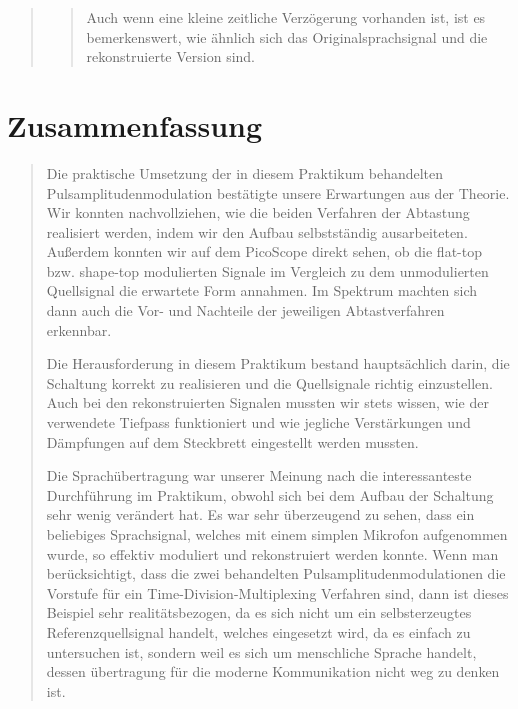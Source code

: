 \begin{quote}
\begin{quote}
            Auch wenn eine kleine zeitliche Verzögerung vorhanden ist, ist es
            bemerkenswert, wie ähnlich sich das Originalsprachsignal und die
            rekonstruierte Version sind. 
            
            \end{quote}  %
       	
       	
         	
    \end{quote}%
    
    \section{Zusammenfassung}
    \begin{quote}
	
    	Die praktische Umsetzung der in diesem Praktikum behandelten
    	Pulsamplitudenmodulation bestätigte unsere Erwartungen aus der Theorie. Wir
    	konnten nachvollziehen, wie die beiden Verfahren der Abtastung realisiert
    	werden, indem wir den Aufbau selbstständig ausarbeiteten. Außerdem konnten wir
    	auf dem PicoScope direkt sehen, ob die flat-top bzw. shape-top modulierten
    	Signale im Vergleich zu dem unmodulierten Quellsignal die erwartete Form
    	annahmen. Im Spektrum machten sich dann auch die Vor- und Nachteile der
    	jeweiligen Abtastverfahren erkennbar.
    	
    	\vspace{0.5em}
    	
    	Die Herausforderung in diesem Praktikum bestand hauptsächlich darin, die
    	Schaltung korrekt zu realisieren und die Quellsignale richtig einzustellen.
    	Auch bei den rekonstruierten Signalen mussten wir stets wissen, wie der verwendete 
    	Tiefpass funktioniert und wie jegliche Verstärkungen und Dämpfungen auf dem
    	Steckbrett eingestellt werden mussten.
    	
    	\vspace{0.5em}
    	
    	Die Sprachübertragung war unserer Meinung nach die interessanteste Durchführung
    	im Praktikum, obwohl sich bei dem Aufbau der Schaltung sehr wenig verändert
    	hat. Es war sehr überzeugend zu sehen, dass ein beliebiges Sprachsignal,
    	welches mit einem simplen Mikrofon aufgenommen wurde, so effektiv
    	moduliert und rekonstruiert werden konnte. Wenn man berücksichtigt, dass die
    	zwei behandelten Pulsamplitudenmodulationen die Vorstufe für ein Time-Division-Multiplexing
    	Verfahren sind, dann ist dieses Beispiel sehr realitätsbezogen, da es sich
    	nicht um ein selbsterzeugtes Referenzquellsignal handelt, welches
    	eingesetzt wird, da es einfach zu untersuchen ist, sondern weil es sich um
    	menschliche Sprache handelt, dessen übertragung für die moderne Kommunikation  
    	nicht weg zu denken ist.
	

    \end{quote}%
         


